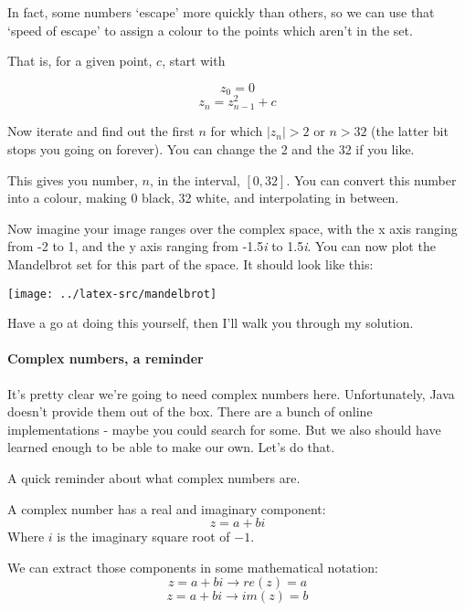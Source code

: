 \documentclass{article}
\begin{document}
        In fact, some numbers `escape' more quickly than others, so we can use that `speed of escape' to assign a colour to the points
        which aren't in the set.
        
        That is, for a given point, $c$, start with 
        
        $$z_0 = 0$$
        $$z_n = z_{n-1}^2 + c$$
        
        Now iterate and find out the first $n$ for which $|z_n| > 2$ or $n > 32$ (the latter bit stops you going on forever). You can
        change the 2 and the 32 if you like.
        
        This gives you number, $n$, in the interval, $[0,32]$. You can convert this number into a colour, making 0 black, 32 white, and
        interpolating in between.
        
        Now imagine your image ranges over the complex space, with the x axis ranging from -2 to 1, and the y axis ranging from
        -1.5\emph{i} to 1.5\emph{i}. You can now plot the Mandelbrot set for this part of the space. It should look like this:
        
        \begin{center}
            \texttt{[image: ../latex-src/mandelbrot]}
        \end{center}
        
        Have a go at doing this yourself, then I'll walk you through my solution.
        
        \paragraph{Complex numbers, a reminder}
            It's pretty clear we're going to need complex numbers here. Unfortunately, Java doesn't provide them out of the box. There are
            a bunch of online implementations - maybe you could search for some. But we also should have learned enough to be able to make
            our own. Let's do that.
            
            A quick reminder about what complex numbers are.
            
            A complex number has a real and imaginary component: 
            $$z = a + bi$$
            Where $i$ is the imaginary square root of $-1$.
            
            We can extract those components in some mathematical notation: 
            $$z = a + bi \rightarrow re(z) = a$$
            $$z = a + bi \rightarrow im(z) = b$$
            
\end{document}

